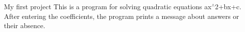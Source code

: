 My first project This is a program for solving quadratic equations ax$^\wedge$2+bx+c. After entering the coefficients, the program prints a message about answers or their absence. 